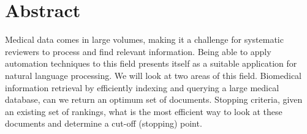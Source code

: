 \chapter*{\Large \center Abstract}

Medical data comes in large volumes, making it a challenge for systematic reviewers to process and find relevant information. Being able to apply automation techniques to this field presents itself as a suitable application for natural language processing. We will look at two areas of this field. Biomedical information retrieval by efficiently indexing and querying a large medical database, can we return an optimum set of documents. Stopping criteria, given an existing set of rankings, what is the most efficient way to look at these documents and determine a cut-off (stopping) point.
 
